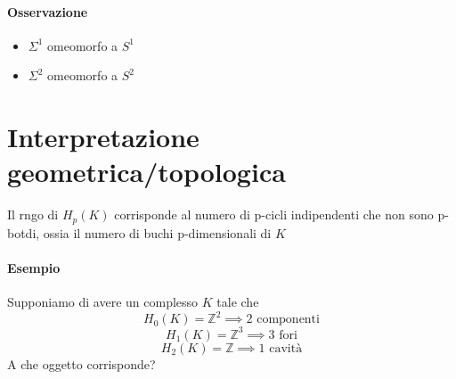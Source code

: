 \documentclass[a4paper]{report}
\newcommand{\Z}{\ensuremath{\mathbb{Z}}}
\begin{document}
\paragraph{Osservazione}
\begin{itemize}
    \item $\Sigma^1$ omeomorfo a $S^1$
    \item $\Sigma^2$ omeomorfo a $S^2$
\end{itemize}
\section{Interpretazione geometrica/topologica}
Il rngo di $H_p(K)$ corrisponde al numero di p-cicli indipendenti che non sono p-botdi, ossia il numero di buchi p-dimensionali di $K$
\paragraph{Esempio}
Supponiamo di avere un complesso $K$ tale che
\[
    H_0(K)=\Z^2\implies\text{2 componenti}
\]
\[
    H_1(K)=\Z^3\implies\text{3 fori}
\]
\[
    H_2(K)=\Z\implies\text{1 cavità}
\]
A che oggetto corrisponde?
\end{document}
